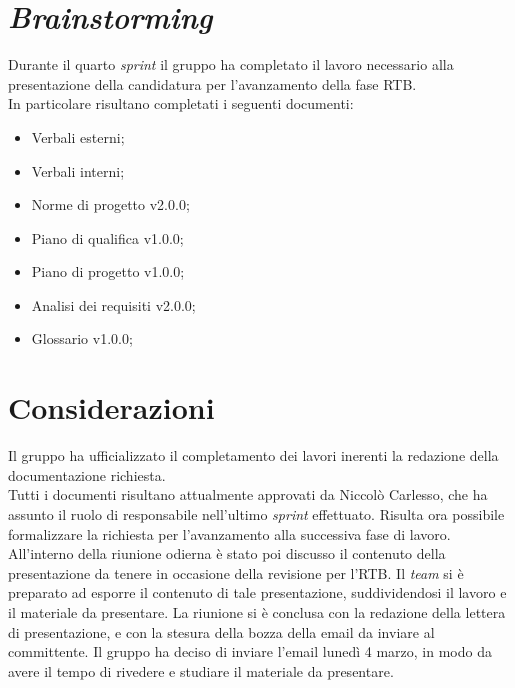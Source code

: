 \section{\textit{Brainstorming}}
Durante il quarto \textit{sprint} il gruppo ha completato il lavoro necessario
alla presentazione della candidatura per l'avanzamento della fase RTB.\\
In particolare risultano completati i seguenti documenti:
\begin{itemize}
	\item Verbali esterni;
	\item Verbali interni;
	\item Norme di progetto v2.0.0;
	\item Piano di qualifica v1.0.0;
	\item Piano di progetto v1.0.0;
	\item Analisi dei requisiti v2.0.0;
	\item Glossario v1.0.0;
\end{itemize}

\section{Considerazioni}
Il gruppo ha ufficializzato il completamento dei lavori inerenti la redazione
della documentazione richiesta.\\
Tutti i documenti risultano attualmente approvati da Niccolò Carlesso, che ha 
assunto il ruolo di responsabile nell'ultimo \textit{sprint} effettuato.
Risulta ora possibile formalizzare la richiesta per l'avanzamento alla 
successiva fase di lavoro.\\
All'interno della riunione odierna è stato poi discusso il contenuto della 
presentazione da tenere in occasione della revisione per l'RTB.
Il \textit{team} si è preparato ad esporre il contenuto di tale presentazione, 
suddividendosi il lavoro e il materiale da presentare.
La riunione si è conclusa con la redazione della lettera di presentazione, e con
la stesura della bozza della email da inviare al committente. Il gruppo ha
deciso di inviare l'email lunedì 4 marzo, in modo da avere il tempo di
rivedere e studiare il materiale da presentare.
